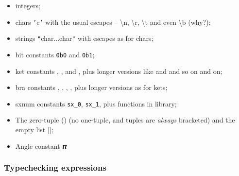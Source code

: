 \documentclass[11pt,a4paper]{article}
\newcommand{\verbtt}[1]{\texttt{\small{}#1}}
\begin{document}
\begin{itemize}
\item integers;
\item chars \verbtt{'}c\verbtt{'} with the usual escapes -- \textbackslash{n}, \textbackslash{r}, \textbackslash{t} and even \textbackslash{b} (why?);
\item strings \verbtt{"}char...char\verbtt{"} with escapes as for chars;
\item bit constants \verbtt{0b0} and \verbtt{0b1};
\item ket constants \zero, \one, \plus{} and \minus, plus longer versions like  and \bv{+-+} and so on and on;
\item bra constants , , \vb{+}, \vb{-}, plus longer versions as for kets; 
\item sxnum constants \verbtt{sx\_0}, \verbtt{sx\_1}, plus functions in library;
\item The zero-tuple () (no one-tuple, and tuples are \emph{always} bracketed) and the empty list [];
\item Angle constant 𝝅
\end{itemize}

\subsubsection{Typechecking expressions}
\end{document}
